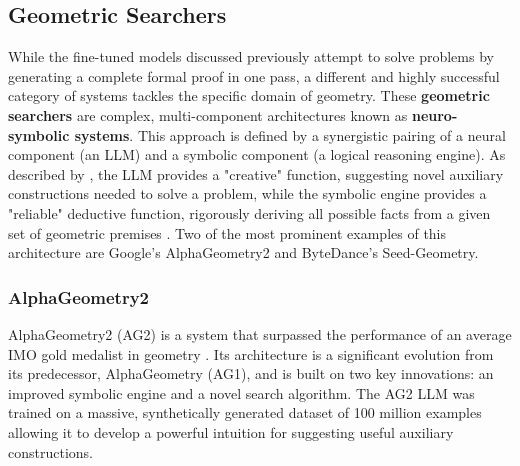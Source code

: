 \documentclass[12pt, letterpaper]{article}
\begin{document}
\subsection{Geometric Searchers}







While the fine-tuned models discussed previously attempt to solve problems by generating a complete formal proof in one pass, a different and highly successful category of systems tackles the specific domain of geometry. These \textbf{geometric searchers} are complex, multi-component architectures known as \textbf{neuro-symbolic systems}. This approach is defined by a synergistic pairing of a neural component (an LLM) and a symbolic component (a logical reasoning engine). As described by \citet{chervonyi2025goldmedalistperformancesolvingolympiad}, the LLM provides a "creative" function, suggesting novel auxiliary constructions needed to solve a problem, while the symbolic engine provides a "reliable" deductive function, rigorously deriving all possible facts from a given set of geometric premises \citep{chervonyi2025goldmedalistperformancesolvingolympiad}. Two of the most prominent examples of this architecture are Google's AlphaGeometry2 and ByteDance's Seed-Geometry.

\subsubsection{AlphaGeometry2}
AlphaGeometry2 (AG2) is a system that surpassed the performance of an average IMO gold medalist in geometry \citep{chervonyi2025goldmedalistperformancesolvingolympiad}. Its architecture is a significant evolution from its predecessor, AlphaGeometry (AG1), and is built on two key innovations: an improved symbolic engine and a novel search algorithm. The AG2 LLM was trained on a massive, synthetically generated dataset of 100 million examples allowing it to develop a powerful intuition for suggesting useful auxiliary constructions.
\end{document}
